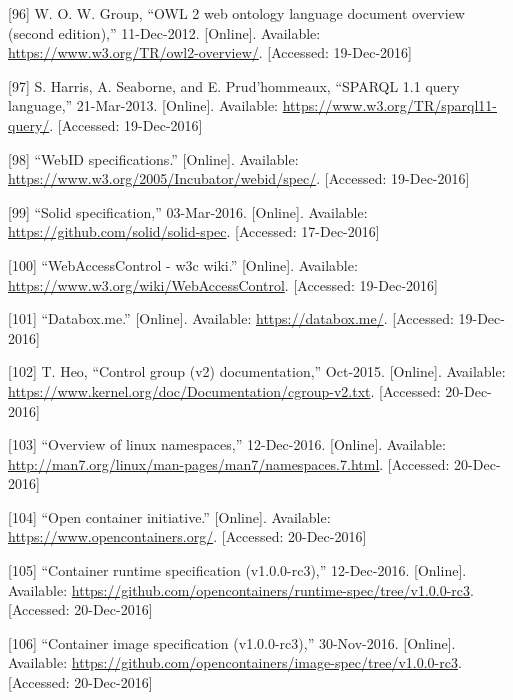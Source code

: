 \documentclass[12pt,english,a4paper,titlepage,cleardoublepage=empty,dottedtoc]{report}
\begin{document}
\hypertarget{ref-web_w3c-tr_owl}{}
{[}96{]} W. O. W. Group, ``OWL 2 web ontology language document overview
(second edition),'' 11-Dec-2012. {[}Online{]}. Available:
\url{https://www.w3.org/TR/owl2-overview/}. {[}Accessed: 19-Dec-2016{]}

\hypertarget{ref-web_w3c-tr_sparql}{}
{[}97{]} S. Harris, A. Seaborne, and E. Prud'hommeaux, ``SPARQL 1.1
query language,'' 21-Mar-2013. {[}Online{]}. Available:
\url{https://www.w3.org/TR/sparql11-query/}. {[}Accessed: 19-Dec-2016{]}

\hypertarget{ref-web_w3c-draft_webid}{}
{[}98{]} ``WebID specifications.'' {[}Online{]}. Available:
\url{https://www.w3.org/2005/Incubator/webid/spec/}. {[}Accessed:
19-Dec-2016{]}

\hypertarget{ref-web_spec_solid}{}
{[}99{]} ``Solid specification,'' 03-Mar-2016. {[}Online{]}. Available:
\url{https://github.com/solid/solid-spec}. {[}Accessed: 17-Dec-2016{]}

\hypertarget{ref-web_2016_wiki_webaccesscontrol}{}
{[}100{]} ``WebAccessControl - w3c wiki.'' {[}Online{]}. Available:
\url{https://www.w3.org/wiki/WebAccessControl}. {[}Accessed:
19-Dec-2016{]}

\hypertarget{ref-web_2016_demo_databox}{}
{[}101{]} ``Databox.me.'' {[}Online{]}. Available:
\url{https://databox.me/}. {[}Accessed: 19-Dec-2016{]}

\hypertarget{ref-web_2015_cgroup-doc}{}
{[}102{]} T. Heo, ``Control group (v2) documentation,'' Oct-2015.
{[}Online{]}. Available:
\url{https://www.kernel.org/doc/Documentation/cgroup-v2.txt}.
{[}Accessed: 20-Dec-2016{]}

\hypertarget{ref-web_2016_kernel-namespace}{}
{[}103{]} ``Overview of linux namespaces,'' 12-Dec-2016. {[}Online{]}.
Available: \url{http://man7.org/linux/man-pages/man7/namespaces.7.html}.
{[}Accessed: 20-Dec-2016{]}

\hypertarget{ref-web_2016_open-container-initiative}{}
{[}104{]} ``Open container initiative.'' {[}Online{]}. Available:
\url{https://www.opencontainers.org/}. {[}Accessed: 20-Dec-2016{]}

\hypertarget{ref-web_oci-spec_runtime}{}
{[}105{]} ``Container runtime specification (v1.0.0-rc3),'' 12-Dec-2016.
{[}Online{]}. Available:
\url{https://github.com/opencontainers/runtime-spec/tree/v1.0.0-rc3}.
{[}Accessed: 20-Dec-2016{]}

\hypertarget{ref-web_oci-spec_image}{}
{[}106{]} ``Container image specification (v1.0.0-rc3),'' 30-Nov-2016.
{[}Online{]}. Available:
\url{https://github.com/opencontainers/image-spec/tree/v1.0.0-rc3}.
{[}Accessed: 20-Dec-2016{]}
\end{document}
